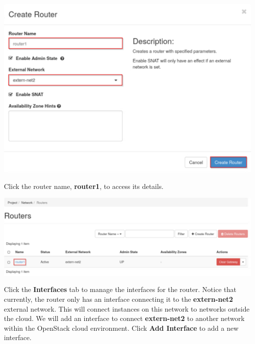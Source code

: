 \documentclass[letterpaper, 12pt]{article}
\begin{document}
\begin{enumerate}
\begin{labstep}
        \begin{center}
            \includegraphics[scale=0.5]{images/part2/step3.png}
        \end{center}
    \end{labstep}

    \begin{labstep}
        Click the router name, \textbf{router1}, to access its details.

        \begin{center}
            \includegraphics[width=\linewidth]{images/part2/step4.png}
        \end{center}
    \end{labstep}

    \begin{labstep}
        Click the \textbf{Interfaces} tab to manage the interfaces for the router.
        Notice that currently, the router only has an interface connecting it to the \textbf{extern-net2} external network.
        This will connect instances on this network to networks outside the cloud.
        We will add an interface to connect \textbf{extern-net2} to another network within the OpenStack cloud environment.
        Click \textbf{Add Interface} to add a new interface.


\end{labstep}
\end{enumerate}
\end{document}
